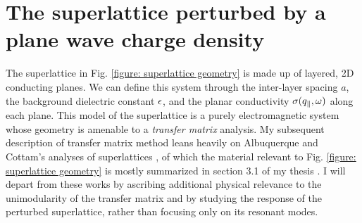 \section{The superlattice perturbed by a plane wave charge density}

The superlattice in Fig. \ref{figure: superlattice geometry} is made up of layered, 2D conducting planes.  We can define this system through the inter-layer spacing $a$, the background dielectric constant $\epsilon$, and the planar conductivity $\sigma(q_{\parallel},\omega)$ along each plane.  This model of the superlattice is a purely electromagnetic system whose geometry is amenable to a {\it transfer matrix} analysis.  My subsequent description of transfer matrix method leans heavily on Albuquerque and Cottam's analyses of superlattices \cite{Cottam1993,Cottam2004}, of which the material relevant to Fig. \ref{figure: superlattice geometry} is mostly summarized in section 3.1 of my thesis \cite{Boyd2021}.  I will depart from these works by ascribing additional physical relevance to the unimodularity of the transfer matrix and by studying the response of the perturbed superlattice, rather than focusing only on its resonant modes.




